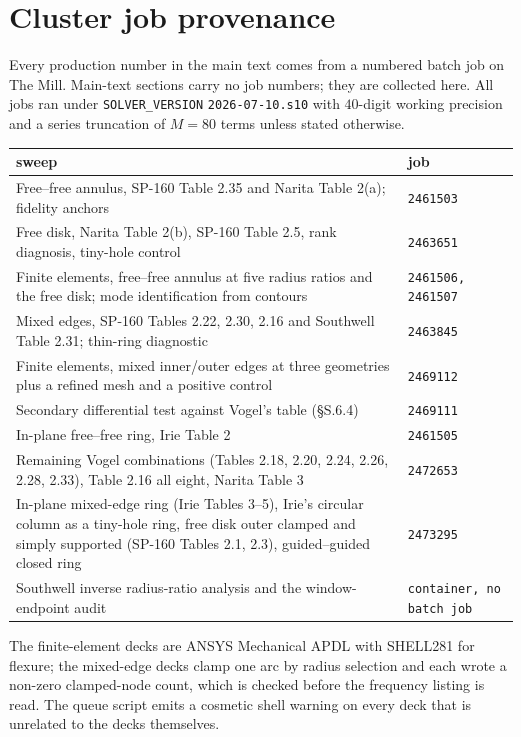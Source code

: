 \documentclass[11pt]{article}
\begin{document}
\section{Cluster job provenance}\label{sec:sm-jobs}
Every production number in the main text comes from a numbered batch job on
The Mill. Main-text sections carry no job numbers; they are collected here.
All jobs ran under \texttt{SOLVER\_VERSION} \texttt{2026-07-10.s10} with
$40$-digit working precision and a series truncation of $M=80$ terms unless
stated otherwise.

\begin{center}\small
\begin{tabular}{p{}l}
\toprule
sweep & job\\
\midrule
Free--free annulus, SP-160 Table 2.35 and Narita Table 2(a); fidelity anchors & \texttt{2461503}\\
Free disk, Narita Table 2(b), SP-160 Table 2.5, rank diagnosis, tiny-hole control & \texttt{2463651}\\
Finite elements, free--free annulus at five radius ratios and the free disk; mode identification from contours & \texttt{2461506, 2461507}\\
Mixed edges, SP-160 Tables 2.22, 2.30, 2.16 and Southwell Table 2.31; thin-ring diagnostic & \texttt{2463845}\\
Finite elements, mixed inner/outer edges at three geometries plus a refined mesh and a positive control & \texttt{2469112}\\
Secondary differential test against Vogel's table (\S{}S.6.4) & \texttt{2469111}\\
In-plane free--free ring, Irie Table 2 & \texttt{2461505}\\
Remaining Vogel combinations (Tables 2.18, 2.20, 2.24, 2.26, 2.28, 2.33), Table 2.16 all eight, Narita Table 3 & \texttt{2472653}\\
In-plane mixed-edge ring (Irie Tables 3--5), Irie's circular column as a tiny-hole ring, free disk outer clamped and simply supported (SP-160 Tables 2.1, 2.3), guided--guided closed ring & \texttt{2473295}\\
Southwell inverse radius-ratio analysis and the window-endpoint audit & \texttt{container, no batch job}\\
\bottomrule
\end{tabular}
\end{center}

The finite-element decks are ANSYS Mechanical APDL \cite{ansysSM} with
SHELL281 for flexure; the mixed-edge decks clamp one arc by radius selection
and each wrote a non-zero clamped-node count, which is checked before the
frequency listing is read. The queue script emits a cosmetic shell warning on
every deck that is unrelated to the decks themselves.
\end{document}
